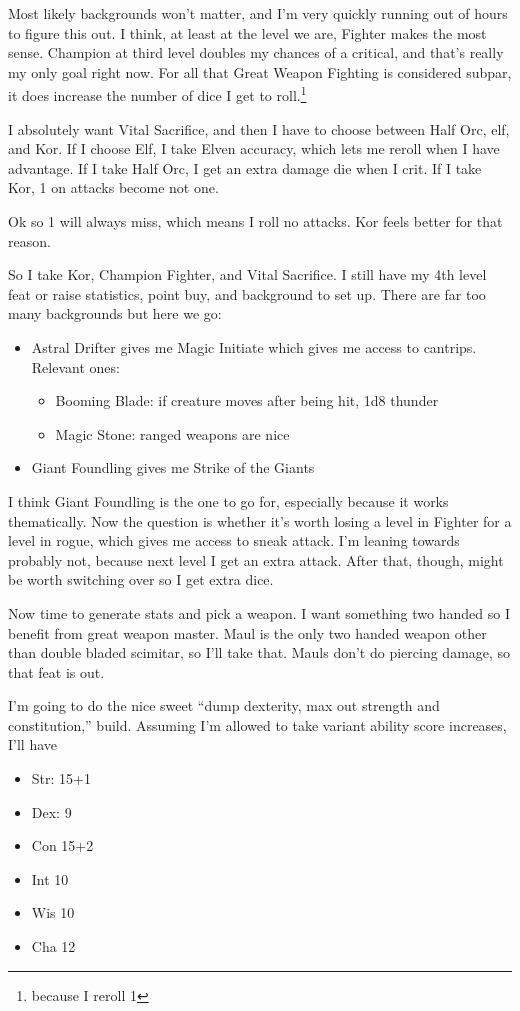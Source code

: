 \documentclass[12pt]{article}[titlepage]
\newcommand{\say}[1]{``#1''}
\renewcommand{\,}{\textsuperscript{,}}
\begin{document}
Most likely backgrounds won't matter, and I'm very quickly running out of hours to figure this out.
I think, at least at the level we are, Fighter makes the most sense.
Champion at third level doubles my chances of a critical, and that's really my only goal right now.
For all that Great Weapon Fighting is considered subpar, it does increase the number of dice I get to roll.\footnote{because I reroll 1}

I absolutely want Vital Sacrifice, and then I have to choose between Half Orc, elf, and Kor.
If I choose Elf, I take Elven accuracy, which lets me reroll when I have advantage.
If I take Half Orc, I get an extra damage die when I crit.
If I take Kor, 1 on attacks become not one.

Ok so 1 will always miss, which means I roll no attacks.
Kor feels better for that reason.

So I take Kor, Champion Fighter, and Vital Sacrifice.
I still have my 4th level feat or raise statistics, point buy, and background to set up.
There are far too many backgrounds but here we go:

\begin{itemize}
\item Astral Drifter gives me Magic Initiate which gives me access to cantrips.
Relevant ones:
\begin{itemize}
\item Booming Blade: if creature moves after being hit, 1d8 thunder
\item Magic Stone: ranged weapons are nice
\end{itemize}
\item Giant Foundling gives me Strike of the Giants
\end{itemize}

I think Giant Foundling is the one to go for, especially because it works thematically.
Now the question is whether it's worth losing a level in Fighter for a level in rogue, which gives me access to sneak attack.
I'm leaning towards probably not, because next level I get an extra attack.
After that, though, might be worth switching over so I get extra dice.

Now time to generate stats and pick a weapon.
I want something two handed so I benefit from great weapon master.
Maul is the only two handed weapon other than double bladed scimitar, so I'll take that.
Mauls don't do piercing damage, so that feat is out.

I'm going to do the nice sweet \say{dump dexterity, max out strength and constitution,} build.
Assuming I'm allowed to take variant ability score increases, I'll have
\begin{itemize}
\item Str: 15+1
\item Dex: 9
\item Con 15+2
\item Int 10
\item Wis 10
\item Cha 12
\end{itemize}
\end{document}
